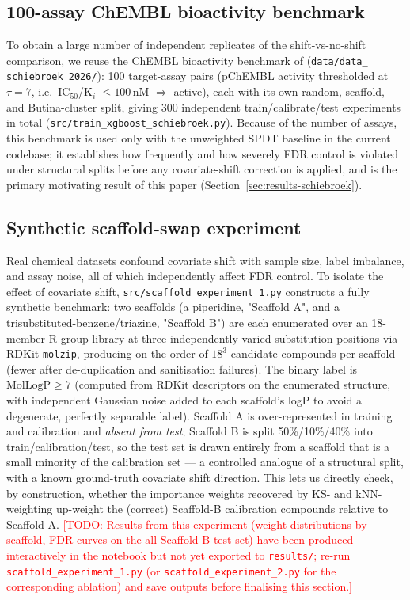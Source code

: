 \documentclass[11pt]{article}
\newcommand{\TODO}[1]{\textcolor{red}{[TODO: #1]}}
\begin{document}
\subsection{100-assay ChEMBL bioactivity benchmark}
\label{sec:data-schiebroek}
To obtain a large number of independent replicates of the shift-vs-no-shift
comparison, we reuse the ChEMBL bioactivity benchmark of
\citet{schiebroek2026} (\texttt{data/data\_ schiebroek\_2026/}): 100
target-assay pairs (pChEMBL activity thresholded at $\tau=7$, i.e.\ IC$_{50}$/K$_i$
$\le 100\,$nM $\Rightarrow$ active), each with its own random, scaffold, and
Butina-cluster split, giving 300 independent train/calibrate/test
experiments in total (\texttt{src/train\_xgboost\_schiebroek.py}). Because of
the number of assays, this benchmark is used only with the unweighted SPDT
baseline in the current codebase; it establishes how frequently and how
severely FDR control is violated under structural splits before any
covariate-shift correction is applied, and is the primary motivating result
of this paper (Section~\ref{sec:results-schiebroek}).

\subsection{Synthetic scaffold-swap experiment}
\label{sec:data-synthetic}
Real chemical datasets confound covariate shift with sample size, label
imbalance, and assay noise, all of which independently affect FDR control. To
isolate the effect of covariate shift, \texttt{src/scaffold\_experiment\_1.py}
constructs a fully synthetic benchmark: two scaffolds (a piperidine,
"Scaffold A", and a trisubstituted-benzene/triazine, "Scaffold B") are each
enumerated over an 18-member R-group library at three independently-varied
substitution positions via RDKit \texttt{molzip}, producing on the order of
$18^3$ candidate compounds per scaffold (fewer after de-duplication and
sanitisation failures). The binary label is $\mathrm{MolLogP} \ge 7$
(computed from RDKit descriptors on the enumerated structure, with
independent Gaussian noise added to each scaffold's logP to avoid a
degenerate, perfectly separable label). Scaffold A is over-represented in
training and calibration and \emph{absent from test}; Scaffold B is split
50\%/10\%/40\% into train/calibration/test, so the test set is drawn entirely
from a scaffold that is a small minority of the calibration set --- a
controlled analogue of a structural split, with a known ground-truth
covariate shift direction. This lets us directly check, by construction,
whether the importance weights recovered by KS- and kNN-weighting up-weight
the (correct) Scaffold-B calibration compounds relative to Scaffold A. \TODO{
Results from this experiment (weight distributions by scaffold, FDR curves
on the all-Scaffold-B test set) have been produced interactively in the
notebook but not yet exported to \texttt{results/}; re-run
\texttt{scaffold\_experiment\_1.py} (or \texttt{scaffold\_experiment\_2.py}
for the corresponding ablation) and save outputs before finalising this
section.}
\end{document}

